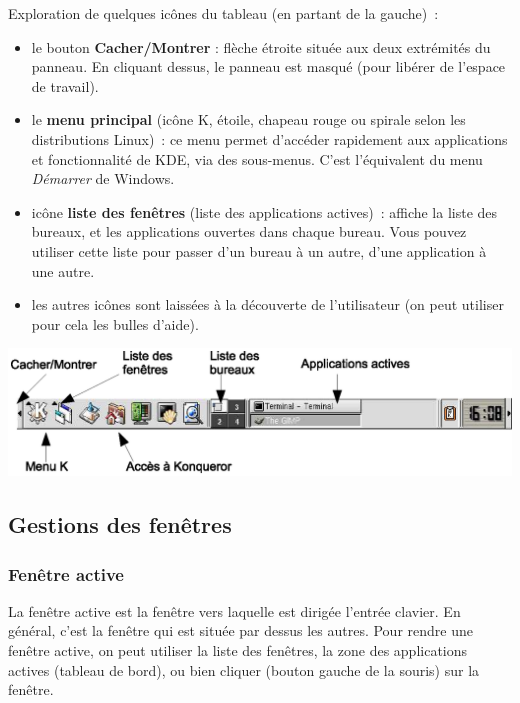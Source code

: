 \documentclass[12pt,a4paper]{article}
\begin{document}
    Exploration de quelques icônes du tableau (en partant de la
    gauche)~:

    \begin{itemize}
    \item le bouton {\bf Cacher/Montrer} : flèche étroite située aux deux
      extrémités du panneau. En cliquant dessus, le panneau est masqué
      (pour libérer de l'espace de travail).

    \item le {\bf menu principal} (icône K, étoile, chapeau rouge ou
      spirale selon les distributions Linux)~: ce menu permet
      d'accéder rapidement aux applications et fonctionnalité de KDE,
      via des sous-menus. C'est l'équivalent du menu {\emph{Démarrer}}
      de Windows.

    \item icône {\bf liste des fenêtres} (liste des applications actives)~:
      affiche la liste des bureaux, et les applications ouvertes dans
      chaque bureau. Vous pouvez utiliser cette liste pour passer d'un
      bureau à un autre, d'une application à une autre.

    \item les autres icônes sont laissées à la découverte de
      l'utilisateur (on peut utiliser pour cela les bulles d'aide).

    \end{itemize}


    \includegraphics{img/kicker.eps}


\subsection{Gestions des fenêtres}

\subsubsection{Fenêtre active}

    La fenêtre active est la fenêtre vers laquelle est dirigée
    l'entrée clavier. En général, c'est la fenêtre qui est située par
    dessus les autres.  Pour rendre une fenêtre active, on peut
    utiliser la liste des fenêtres, la zone des applications actives
    (tableau de bord), ou bien cliquer (bouton gauche de la souris)
    sur la fenêtre.
\end{document}
